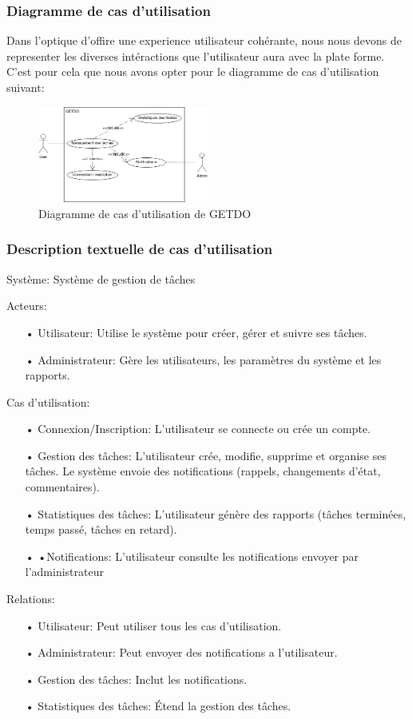 \documentclass[a4paper,12pt]{report}
\begin{document}
\subsubsection{Diagramme de cas d'utilisation}
Dans l'optique d'offire une experience utilisateur cohérante, nous nous devons de representer les diverses intéractions que l'utilisateur aura avec la plate forme. C'est pour cela que nous avons opter pour le diagramme de cas d'utilisation suivant: 
\begin{figure}[h!]
    \includegraphics[width=0.5\textwidth]{./images/Diagramme_useCase.drawio.png}
    \caption{Diagramme de cas d'utilisation de GETDO}
    \label{fig:GETDO_UseCaseDiagramm}
\end{figure}

\subsubsection*{Description textuelle de cas d'utilisation}
Système: Système de gestion de tâches


Acteurs:
\begin{itemize}
    \item[•]Utilisateur: Utilise le système pour créer, gérer et suivre ses tâches.
    \item[•]Administrateur: Gère les utilisateurs, les paramètres du système et les rapports.
\end{itemize}
Cas d'utilisation:
\begin{itemize}
    \item[•]Connexion/Inscription: L'utilisateur se connecte ou crée un compte.
    \item[•]Gestion des tâches:
        L'utilisateur crée, modifie, supprime et organise ses tâches.
        Le système envoie des notifications (rappels, changements d'état, commentaires).
    \item[•]Statistiques des tâches: L'utilisateur génère des rapports (tâches terminées, temps passé, tâches en retard).
    \item[•] •Notifications: L'utilisateur consulte les notifications envoyer par l'administrateur
\end{itemize}
Relations:
\begin{itemize}
    \item[•]Utilisateur: Peut utiliser tous les cas d'utilisation.
    \item[•]Administrateur: Peut envoyer des notifications a l'utilisateur.
    \item[•]Gestion des tâches: Inclut les notifications.
    \item[•]Statistiques des tâches: Étend la gestion des tâches.
\end{itemize}
\end{document}
